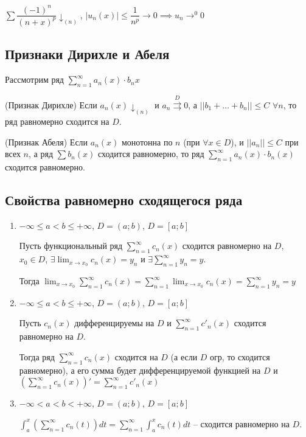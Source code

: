 \begin{example}
$\sum \dfrac{(-1)^n}{(n + x)^p} \downarrow_{(n)}$, $|u_n(x)| \leq \dfrac{1}{n^p} \to 0 \implies u_n \to^0 0$ 
\end{example}

\subsection{Признаки Дирихле и Абеля}

Рассмотрим ряд $\sum_{n=1}^{\infty} a_n(x) \cdot b_n{x}$

\begin{theorem}
(Признак Дирихле) Если $a_n(x) \downarrow_{(n)}$ и $a_n \overset{D}{\rightrightarrows} 0$, а $||b_1 + \dots + b_n|| \leq C$ $\forall n$, то ряд равномерно сходится на $D$.
\end{theorem}

\begin{theorem}
(Признак Абеля) Если $a_n(x)$ монотонна по $n$ (при $\forall x \in D$), и $||a_n|| \leq C$ при всех $n$, а ряд $\sum b_n(x)$ сходится равномерно, то ряд $\sum_{n=1}^{\infty} a_n(x) \cdot b_n(x)$ сходится равномерно.
\end{theorem}

\subsection{Свойства равномерно сходящегося ряда}

\begin{enumerate}
    \item $-\infty \leq a < b \leq +\infty$, $D= (a; b)$, $D = [a; b]$
          
          Пусть функциональный ряд $\sum_{n=1}^{\infty} c_n(x)$ сходится равномерно на $D$, $x_0 \in D$, $\exists \lim_{x \to x_0} c_n(x) = y_n$ и $\exists \sum_{n=1}^{\infty} y_n = y$.

          Тогда $\lim_{x \to x_0} \sum_{n = 1}^{\infty} c_n(x) = \sum_{n=1}^{\infty} \lim_{x \to x_0} c_n(x) = \sum_{n=1}^{\infty} y_n = y$
    \item $-\infty \leq a < b \leq +\infty$, $D= (a; b)$, $D = [a; b]$
          
          Пусть $c_n(x)$ дифференцируемы на $D$ и $\sum_{n=1}^{\infty} c'_n(x)$ сходится равномерно на $D$.

          Тогда ряд $\sum_{n=1}^{\infty} c_n(x)$ сходится на $D$ (а если $D$ огр, то сходится равномерно), а его сумма будет дифференцируемой функцией на $D$ и $\left(\sum_{n=1}^{\infty} c_n(x)\right)' = \sum_{n=1}^{\infty} c'_n(x)$
    \item $-\infty < a < b < +\infty$, $D= (a; b)$, $D = [a; b]$
    
          $\int_{a}^{x}\left(\sum_{n=1}^{\infty} c_n(t)\right) dt = \sum_{n=1}^{\infty} \int_{a}^{x} c_n(t) dt$ -- сходится равномерно на $D$.
\end{enumerate}